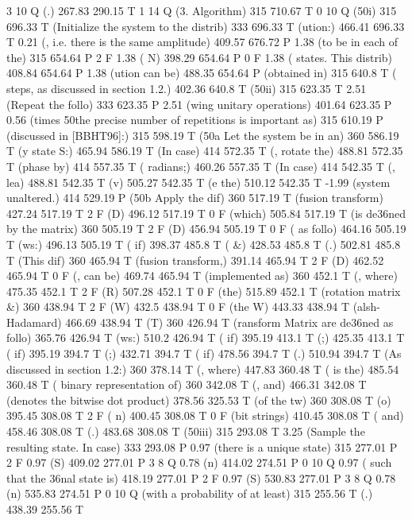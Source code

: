 3 10 Q
(.) 267.83 290.15 T
1 14 Q
(3. Algorithm) 315 710.67 T
0 10 Q
(\050i) 315 696.33 T
(Initialize the system to the distrib) 333 696.33 T
(ution:) 466.41 696.33 T
0.21 (, i.e. there is the same amplitude) 409.57 676.72 P
1.38 (to be in each of the) 315 654.64 P
2 F
1.38 ( N) 398.29 654.64 P
0 F
1.38 ( states. This distrib) 408.84 654.64 P
1.38 (ution can be) 488.35 654.64 P
(obtained in) 315 640.8 T
( steps, as discussed in section 1.2.) 402.36 640.8 T
(\050ii) 315 623.35 T
2.51 (Repeat the follo) 333 623.35 P
2.51 (wing unitary operations) 401.64 623.35 P
0.56 (times \050the precise number of repetitions is important as) 315 610.19 P
(discussed in [BBHT96]:) 315 598.19 T
(\050a Let the system be in an) 360 586.19 T
(y state S:) 465.94 586.19 T
(In case) 414 572.35 T
(, rotate the) 488.81 572.35 T
(phase by) 414 557.35 T
( radians;) 460.26 557.35 T
(In case) 414 542.35 T
(, lea) 488.81 542.35 T
(v) 505.27 542.35 T
(e the) 510.12 542.35 T
-1.99 (system   unaltered.) 414 529.19 P
(\050b Apply the dif) 360 517.19 T
(fusion transform) 427.24 517.19 T
2 F
(D) 496.12 517.19 T
0 F
(which) 505.84 517.19 T
(is de\336ned by the matrix) 360 505.19 T
2 F
(D) 456.94 505.19 T
0 F
( as follo) 464.16 505.19 T
(ws:) 496.13 505.19 T
( if) 398.37 485.8 T
( &) 428.53 485.8 T
(.) 502.81 485.8 T
(This dif) 360 465.94 T
(fusion transform,) 391.14 465.94 T
2 F
(D) 462.52 465.94 T
0 F
(, can be) 469.74 465.94 T
(implemented as) 360 452.1 T
(, where) 475.35 452.1 T
2 F
(R) 507.28 452.1 T
0 F
(the) 515.89 452.1 T
(rotation matrix &) 360 438.94 T
2 F
(W) 432.5 438.94 T
0 F
(the W) 443.33 438.94 T
(alsh-Hadamard) 466.69 438.94 T
(T) 360 426.94 T
(ransform Matrix are de\336ned as follo) 365.76 426.94 T
(ws:) 510.2 426.94 T
( if) 395.19 413.1 T
(;) 425.35 413.1 T
( if) 395.19 394.7 T
(;) 432.71 394.7 T
( if) 478.56 394.7 T
(.) 510.94 394.7 T
(As discussed in section 1.2:) 360 378.14 T
(, where) 447.83 360.48 T
( is the) 485.54 360.48 T
( binary representation of) 360 342.08 T
(, and) 466.31 342.08 T
(denotes the bitwise dot product) 378.56 325.53 T
(of the tw) 360 308.08 T
(o) 395.45 308.08 T
2 F
( n) 400.45 308.08 T
0 F
(bit strings) 410.45 308.08 T
( and) 458.46 308.08 T
(.) 483.68 308.08 T
(\050iii) 315 293.08 T
3.25 (Sample the resulting state. In case) 333 293.08 P
0.97 (there is a unique state) 315 277.01 P
2 F
0.97 (S) 409.02 277.01 P
3 8 Q
0.78 (n) 414.02 274.51 P
0 10 Q
0.97 ( such that the \336nal state is) 418.19 277.01 P
2 F
0.97 (S) 530.83 277.01 P
3 8 Q
0.78 (n) 535.83 274.51 P
0 10 Q
(with a probability of at least) 315 255.56 T
(.) 438.39 255.56 T
